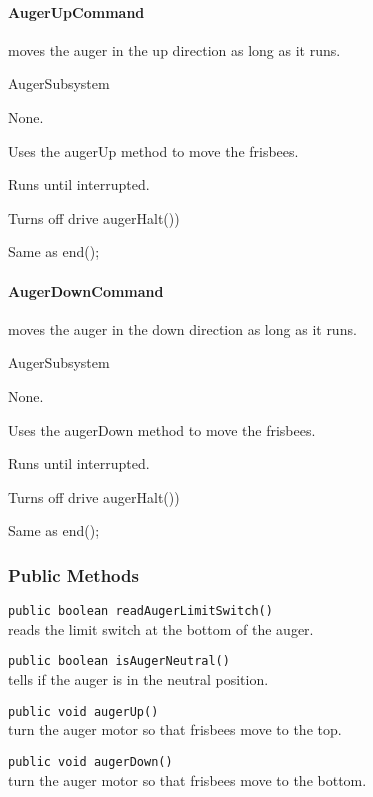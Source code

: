 \documentclass[]{article}
\begin{document}
\paragraph{AugerUpCommand} moves the auger in the up direction as long as it runs.
\begin{description}[topsep=0ex]
\item[requires] AugerSubsystem
\item[initialization]  None.
\item[execute] Uses the augerUp method to move the frisbees.
\item[isDone] Runs until interrupted.
\item[end] Turns off drive augerHalt())
\item[interrupted] Same as end();
\end{description}

\paragraph{AugerDownCommand} moves the auger in the down direction as long as it runs.
\begin{description}[topsep=0ex]
\item[requires] AugerSubsystem
\item[initialization]  None.
\item[execute] Uses the augerDown method to move the frisbees.
\item[isDone] Runs until interrupted.
\item[end] Turns off drive augerHalt())
\item[interrupted] Same as end();
\end{description}

\subsubsection{Public Methods}

\noindent
\lstinline[]|public boolean readAugerLimitSwitch()| \\
reads the limit switch at the bottom of the auger.

\noindent
\lstinline[]|public boolean isAugerNeutral()| \\
tells if the auger is in the neutral position.

\noindent
\lstinline[]|public void augerUp()| \\
turn the auger motor so that frisbees move to the top.

\noindent
\lstinline[]|public void augerDown()| \\
turn the auger motor so that frisbees move to the bottom.
\end{document}

